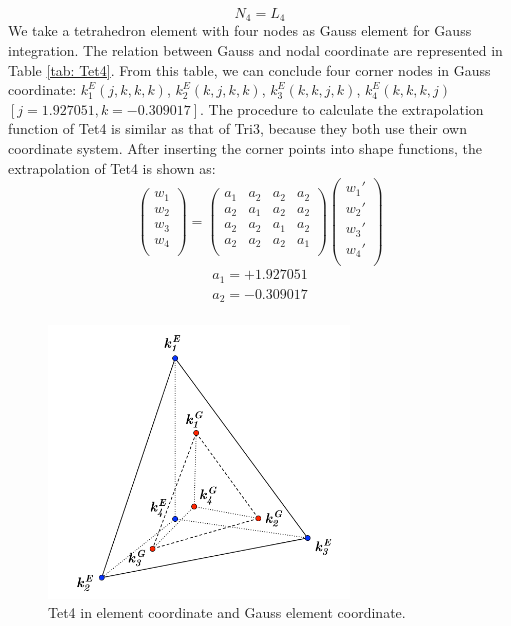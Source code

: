 \begin{equation}
N_4 = L_4
\end{equation}
 We take a tetrahedron element with four nodes as Gauss element for Gauss integration. The relation between Gauss and nodal coordinate are represented in Table \ref{tab: Tet4}. From this table, we can conclude four corner nodes in Gauss coordinate: $k_1^E(j, k, k, k)$, $k_2^E(k, j, k, k)$, $k_3^E(k, k, j, k)$, $k_4^E(k, k, k, j)$ $[j=1.927051, k=-0.309017]$. The procedure to calculate the extrapolation function of Tet4 is similar as that of Tri3, because they both use their own coordinate system. After inserting the corner points into shape functions, the extrapolation of Tet4 is shown as:
\begin{equation}
\begin{pmatrix}
w_1 \\
w_2 \\
w_3 \\
w_4 \\
\end{pmatrix} = \begin{pmatrix}
a_1 & a_2 &  a_2 &  a_2      \\[0.3em]
a_2 & a_1 &  a_2 &  a_2      \\[0.3em]
a_2 & a_2 &  a_1 &  a_2      \\[0.3em]
a_2 & a_2 &  a_2 &  a_1      \\[0.3em]
\end{pmatrix} \begin{pmatrix}
{w_1}' \\
{w_2}' \\
{w_3}' \\
{w_4}' \\
\end{pmatrix}
\end{equation}	
\begin{align*}
a_1 = +1.927051 \\
a_2 = -0.309017 \\
\end{align*}


\begin{figure}[h]
	\begin{center}
		\includegraphics[width=8cm,clip]{Tet4_1.pdf}			
		\caption{Tet4 in element coordinate and Gauss element coordinate.} \label{fig: Tet4_1}
	\end{center} 
\end{figure}

